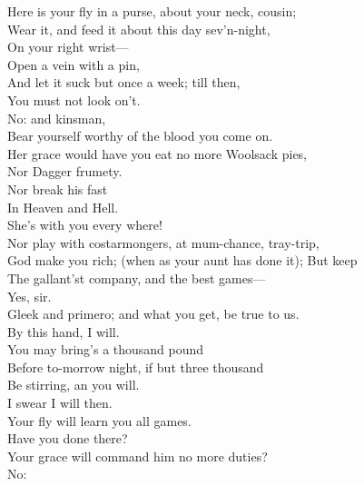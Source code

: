 \documentclass[a4paper,oneside]{memoir}
\begin{document}
\begin{drama*}
Here is your fly in a purse, about your neck, cousin;\\
Wear it, and feed it about this day sev'n-night,\\
On your right wrist---\\
\subtlespeaks {} Open a vein with a pin,\\
And let it suck but once a week; till then,\\
You must not look on't.\\
\dolspeaks {} No: and kinsman,\\
Bear yourself worthy of the blood you come on.\\
\subtlespeaks Her grace would have you eat no more Woolsack pies,\\
Nor Dagger frumety.\\
\dolspeaks {} Nor break his fast\\
In Heaven and Hell.\\
\subtlespeaks {} She's with you every where!\\
Nor play with costarmongers, at mum-chance, tray-trip,\\
God make you rich; (when as your aunt has done it); But keep\\
The gallant'st company, and the best games---\\
\dapperspeaks {}  Yes, sir.\\
\subtlespeaks Gleek and primero; and what you get, be true to us.\\
\dapperspeaks By this hand, I will.\\
\subtlespeaks {} You may bring's a thousand pound\\
Before to-morrow night, if but three thousand\\
Be stirring, an you will.\\
\dapperspeaks {} I swear I will then.\\
\subtlespeaks Your fly will learn you all games.\\
\facespeaks {}  Have you done there?\\
\subtlespeaks Your grace will command him no more duties?\\
\dolspeaks {} No:\\

\end{drama*}
\end{document}
